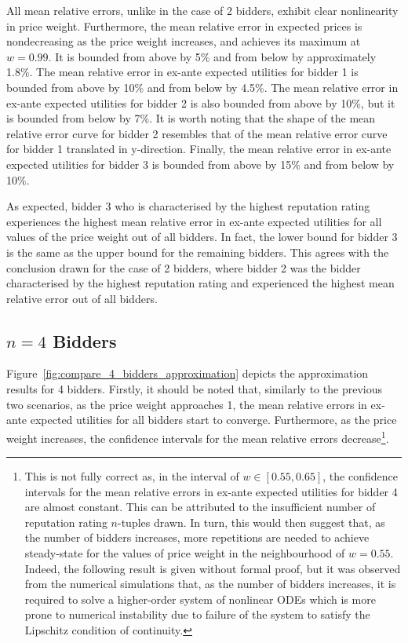 All mean relative errors, unlike in the case of 2 bidders, exhibit clear nonlinearity in price weight. Furthermore, the mean relative error in expected prices is nondecreasing as the price weight increases, and achieves its maximum at $w = 0.99$. It is bounded from above by 5\% and from below by approximately 1.8\%. The mean relative error in ex-ante expected utilities for bidder 1 is bounded from above by 10\% and from below by 4.5\%. The mean relative error in ex-ante expected utilities for bidder 2 is also bounded from above by 10\%, but it is bounded from below by 7\%. It is worth noting that the shape of the mean relative error curve for bidder 2 resembles that of the mean relative error curve for bidder 1 translated in y-direction. Finally, the mean relative error in ex-ante expected utilities for bidder 3 is bounded from above by 15\% and from below by 10\%.

As expected, bidder 3 who is characterised by the highest reputation rating experiences the highest mean relative error in ex-ante expected utilities for all values of the price weight out of all bidders. In fact, the lower bound for bidder 3 is the same as the upper bound for the remaining bidders. This agrees with the conclusion drawn for the case of 2 bidders, where bidder 2 was the bidder characterised by the highest reputation rating and experienced the highest mean relative error out of all bidders.

\subsection{$n=4$ Bidders} %
\label{sub:n_4_bidders_approximation}
Figure~\ref{fig:compare_4_bidders_approximation} depicts the approximation results for 4 bidders. Firstly, it should be noted that, similarly to the previous two scenarios, as the price weight approaches 1, the mean relative errors in ex-ante expected utilities for all bidders start to converge. Furthermore, as the price weight increases, the confidence intervals for the mean relative errors decrease\footnote{This is not fully correct as, in the interval of $w\in [0.55, 0.65]$, the confidence intervals for the mean relative errors in ex-ante expected utilities for bidder 4 are almost constant. This can be attributed to the insufficient number of reputation rating $n$-tuples drawn. In turn, this would then suggest that, as the number of bidders increases, more repetitions are needed to achieve steady-state for the values of price weight in the neighbourhood of $w=0.55$. Indeed, the following result is given without formal proof, but it was observed from the numerical simulations that, as the number of bidders increases, it is required to solve a higher-order system of nonlinear ODEs which is more prone to numerical instability due to failure of the system to satisfy the Lipschitz condition of continuity.}.

